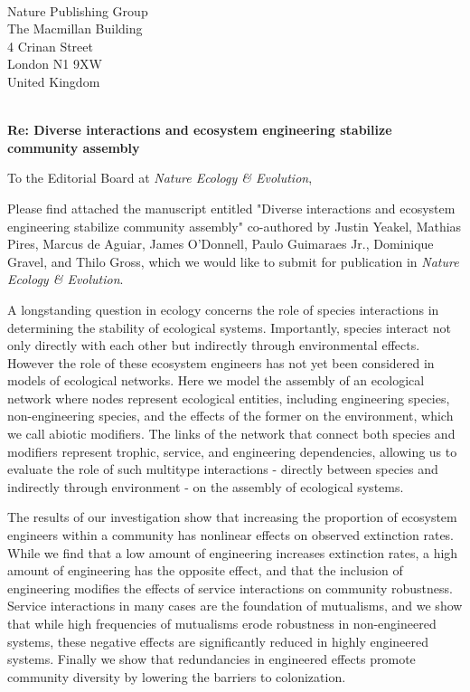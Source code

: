 \documentclass[ucm,12pt]{ucletter}
\begin{document}
\begin{letter}{
  \\Nature Publishing Group\\
  The Macmillan Building\\
  4 Crinan Street\\ 
  London N1 9XW\\
  United Kingdom\\ \\
    \centerline{\bf{Re: Diverse interactions and ecosystem engineering stabilize community assembly}}
    \vspace{10mm}
}


\opening{To the Editorial Board at \emph{Nature Ecology \& Evolution},}


Please find attached the manuscript entitled "Diverse interactions and ecosystem engineering stabilize community assembly" co-authored by Justin Yeakel, Mathias Pires, Marcus de Aguiar, James O'Donnell, Paulo Guimaraes Jr., Dominique Gravel, and Thilo Gross, which we would like to submit for publication in \emph{Nature Ecology \& Evolution}. 

A longstanding question in ecology concerns the role of species interactions in determining the stability of ecological systems. Importantly, species interact not only directly with each other but indirectly through environmental effects. However the role of these ecosystem engineers has not yet been considered in models of ecological networks. Here we model the assembly of an ecological network where nodes represent ecological entities, including engineering species, non-engineering species, and the effects of the former on the environment, which we call abiotic modifiers. The links of the network that connect both species and modifiers represent trophic, service, and engineering dependencies, allowing us to evaluate the role of such multitype interactions - directly between species and indirectly through environment - on the assembly of ecological systems.

The results of our investigation show that increasing the proportion of ecosystem engineers within a community has nonlinear effects on observed extinction rates. While we find that a low amount of engineering increases extinction rates, a high amount of engineering has the opposite effect, and that the inclusion of engineering modifies the effects of service interactions on community robustness. Service interactions in many cases are the foundation of mutualisms, and we show that while high frequencies of mutualisms erode robustness in non-engineered systems, these negative effects are significantly reduced in highly engineered systems. Finally we show that redundancies in engineered effects promote community diversity by lowering the barriers to colonization. 


\end{letter}
\end{document}
